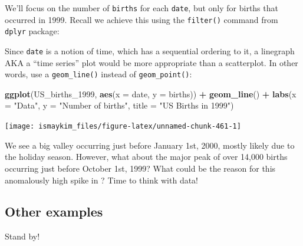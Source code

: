 \documentclass[12pt,]{krantz}
\makeatletter
\newenvironment{Shaded}{\begin{snugshade}}{\end{snugshade}}
\newcommand{\KeywordTok}[1]{\textcolor[rgb]{0.27,0.27,0.27}{\textbf{#1}}}
\newcommand{\DataTypeTok}[1]{\textcolor[rgb]{0.27,0.27,0.27}{#1}}
\newcommand{\DecValTok}[1]{\textcolor[rgb]{0.06,0.06,0.06}{#1}}
\newcommand{\StringTok}[1]{\textcolor[rgb]{0.5,0.5,0.5}{#1}}
\newcommand{\OperatorTok}[1]{\textcolor[rgb]{0.43,0.43,0.43}{\textbf{#1}}}
\newcommand{\NormalTok}[1]{#1}
\newenvironment{kframe}{%
\medskip{}
\setlength{\fboxsep}{.8em}
 \def\at@end@of@kframe{}%
 \ifinner\ifhmode%
  \def\at@end@of@kframe{\end{minipage}}%
  \begin{minipage}{\columnwidth}%
 \fi\fi%
 \def\FrameCommand##1{\hskip\@totalleftmargin \hskip-\fboxsep
 \colorbox{shadecolor}{##1}\hskip-\fboxsep
     \hskip-\linewidth \hskip-\@totalleftmargin \hskip\columnwidth}%
 \MakeFramed {\advance\hsize-\width
   \@totalleftmargin\z@ \linewidth\hsize
   \@setminipage}}%
 {\par\unskip\endMakeFramed%
 \at@end@of@kframe}
\renewenvironment{Shaded}{\begin{kframe}}{\end{kframe}}
\theoremstyle{definition}
\theoremstyle{definition}
\theoremstyle{definition}
\theoremstyle{remark}
\makeatother
\begin{document}
We'll focus on the number of \texttt{births} for each \texttt{date}, but
only for births that occurred in 1999. Recall we achieve this using the
\texttt{filter()} command from \texttt{dplyr} package:

\begin{Shaded}
\end{Shaded}

Since \texttt{date} is a notion of time, which has a sequential ordering
to it, a linegraph AKA a ``time series'' plot would be more appropriate
than a scatterplot. In other words, use a \texttt{geom\_line()} instead
of \texttt{geom\_point()}:

\begin{Shaded}
\begin{Highlighting}[]
\KeywordTok{ggplot}\NormalTok{(US_births_}\DecValTok{1999}\NormalTok{, }\KeywordTok{aes}\NormalTok{(}\DataTypeTok{x =}\NormalTok{ date, }\DataTypeTok{y =}\NormalTok{ births)) }\OperatorTok{+}
\StringTok{  }\KeywordTok{geom_line}\NormalTok{() }\OperatorTok{+}
\StringTok{  }\KeywordTok{labs}\NormalTok{(}\DataTypeTok{x =} \StringTok{"Data"}\NormalTok{, }\DataTypeTok{y =} \StringTok{"Number of births"}\NormalTok{, }\DataTypeTok{title =} \StringTok{"US Births in 1999"}\NormalTok{)}
\end{Highlighting}
\end{Shaded}

\begin{center}\texttt{[image: ismaykim\_files/figure-latex/unnamed-chunk-461-1]} \end{center}

We see a big valley occurring just before January 1st, 2000, mostly
likely due to the holiday season. However, what about the major peak of
over 14,000 births occurring just before October 1st, 1999? What could
be the reason for this anomalously high spike in ? Time to think with
data!

\subsection{Other examples}\label{other-examples}

Stand by!
\end{document}

